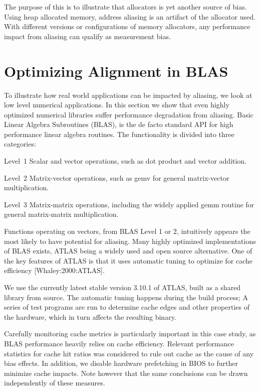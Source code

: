 \documentclass[a4paper,10pt,twocolumn,twoside]{article}
\begin{document}
The purpose of this is to illustrate that allocators is yet another source of bias.
Using heap allocated memory, address aliasing is an artifact of the allocator used.
With different versions or configurations of memory allocators, any performance impact from aliasing can qualify as measurement bias.


\iffalse

\section{Optimizing Alignment in BLAS}

To illustrate how real world applications can be impacted by aliasing, we look at low level numerical applications.
In this section we show that even highly optimized numerical libraries suffer performance degradation from aliasing.
Basic Linear Algebra Subroutines (BLAS), is the de facto standard API for high performance linear algebra routines.
The functionality is divided into three categories: 

\begin{description}
  \item{Level~1} Scalar and vector operations, such as dot product and vector addition.
  \item{Level~2} Matrix-vector operations, such as gemv for general matrix-vector multiplication.
  \item{Level~3} Matrix-matrix operations, including the widely applied gemm routine for general matrix-matrix multiplication. 
\end{description}

Functions operating on vectors, from BLAS Level 1 or 2, intuitively appears the most likely to have potential for aliasing.
Many highly optimized implementations of BLAS exists, ATLAS being a widely used and open source alternative. One of the key features of ATLAS is that it uses automatic tuning to optimize for cache efficiency [Whaley:2000:ATLAS]. 

We use the currently latest stable version 3.10.1 of ATLAS, built as a shared library from source.
The automatic tuning happens during the build process; A series of test programs are run to determine cache edges and other properties of the hardware, which in turn affects the resulting binary. 

Carefully monitoring cache metrics is particularly important in this case study, as BLAS performance heavily relies on cache efficiency.
Relevant performance statistics for cache hit ratios was considered to rule out cache as the cause of any bias effects.
In addition, we disable hardware prefetching in BIOS to further minimize cache impacts. 
Note however that the same conclusions can be drawn independently of these measures.
\end{document}
